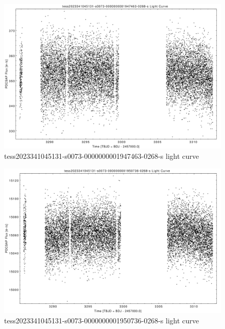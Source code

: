 \documentclass[a4paper,12pt]{article}
\begin{document}
\begin{figure}[htbp]
    \centering
    \includegraphics[width = 1\textwidth]{
      ../lightcurves/tess2023341045131-s0073-0000000001947463-0268-s.pdf}
    \caption{tess2023341045131-s0073-0000000001947463-0268-s light curve}
\end{figure}
\begin{figure}[htbp]
    \centering
    \includegraphics[width = 1\textwidth]{
      ../lightcurves/tess2023341045131-s0073-0000000001950736-0268-s.pdf}
    \caption{tess2023341045131-s0073-0000000001950736-0268-s light curve}
\end{figure}
\end{document}
